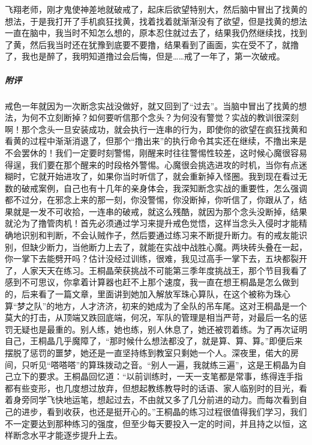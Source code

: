 \begin{case}
    飞翔老师，刚才鬼使神差地就破戒了，起床后欲望特别大，然后脑中冒出了找黄的想法，于是我打开了手机疯狂找黄，找着找着就渐渐没有了欲望，但是找黄的想法一直在脑中，我当时不知怎么想的，原本忍住就过去了，结果我仍然继续找，找到了黄，然后我当时还在犹豫到底要不要撸，结果看到了画面，实在受不了，就撸了，我也是醉了，我明知道撸过会后悔，但是……戒了一年了，第一次破戒。
    \subparagraph{附评} 戒色一年就因为一次断念实战没做好，就又回到了“过去”。当脑中冒出了找黄的想法，为何不立刻断掉？如何要听信那个念头？为何没有警觉？实战的教训很深刻啊！那个念头一旦安装成功，就会执行一连串的行为，即使你的欲望在疯狂找黄和看黄的过程中渐渐消退了，但那个“撸出来”的执行命令其实还在继续，不撸出来是不会罢休的！我们一定要时刻警惕，刚醒来时往往警惕性较差，这时候心魔很容易得逞，我们要在那个醒来的时段格外警惕。心魔很会挑选进攻的时机，当你有点迷糊时，它就开始进攻了，如果你当时听信了，就会重新掉入怪圈。我到现在看过无数的破戒案例，自己也有十几年的亲身体会，我深知断念实战的重要性，怎么强调都不过分，在邪念上来的那一刻，你没警惕，你没断掉，你听信了，你跟从了，结果就是一发不可收拾，一连串的破戒，就这么残酷，就因为那个念头没断掉，结果就沦为了撸管肉机！首先必须通过学习来提升戒色觉悟，这样当念头入侵时才能精确地识别和判断，不会认贼作子，然后要通过练习来不断提升断力。有的戒友能识别，但缺少断力，当他断力上去了，就能在实战中战胜心魔。两块砖头叠在一起，你一掌下去能劈开吗？估计没经过训练，很难，我见过高手一掌下去，五块都裂开了，人家天天在练习。王桐晶荣获挑战不可能第三季年度挑战王，那个节目我看了感到不可思议，你拿着计算器也赶不上那个速度，我一直在想王桐晶是怎么做到的，后来看了一篇文章，里面讲到她加入解放军珠心算队，在这个被称为珠心算“梦之队”的地方，人才济济，初来的她成为了全队的吊车尾。这对王桐晶是一个莫大的打击，从顶端又跌回底端，何况，军队的管理是相当严苛，对最后一名的惩罚无疑也是最重的。别人练，她也练，别人休息了，她还被罚着练。为了再次证明自己，王桐晶几乎魔障了，“那时候什么想法都没了，就是算、算、算。”即便后来摆脱了惩罚的噩梦，她还是一直坚持练到教室只剩她一个人。深夜里，偌大的房间，只听见“嗒嗒嗒”的算珠拨动之音。“别人一遍，我就练三遍”，这是王桐晶为自己立下的要求。王桐晶回忆道：“以前训练时，一天一支笔都是常事，练得连手指都有些变形，也几度想过放弃，但想起教练教导时的话语、家人临别时的目光，看着身旁同学飞快地运笔，想起过去，不由就又多了几分前进的动力。而每次看到自己的进步，看到收获，也还是挺开心的。”王桐晶的练习过程很值得我们学习，我们不一定要达到那种练习的强度，但至少每天要投入一定的时间，并且持之以恒，这样断念水平才能逐步提升上去。
\end{case}

